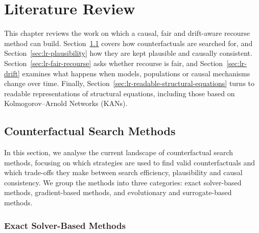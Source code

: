 \section{Literature Review}
\label{sec:literature-review}
This chapter reviews the work on which a causal, fair and drift-aware recourse method can build.
Section~\ref{sec:lr-cf-search} covers how counterfactuals are searched for, and
Section~\ref{sec:lr-plausibility} how they are kept plausible and causally consistent.
Section~\ref{sec:lr-fair-recourse} asks whether recourse is fair, and Section~\ref{sec:lr-drift}
examines what happens when models, populations or causal mechanisms change over time.
Finally, Section~\ref{sec:lr-readable-structural-equations} turns to readable representations of
structural equations, including those based on Kolmogorov--Arnold Networks (KANs).

\subsection{Counterfactual Search Methods}
\label{sec:lr-cf-search}
In this section, we analyse the current landscape of counterfactual search methods, focusing on
which strategies are used to find valid counterfactuals and which trade-offs they make between
search efficiency, plausibility and causal consistency. We group the methods into three categories:
exact solver-based methods, gradient-based methods, and evolutionary and surrogate-based methods.

\subsubsection{Exact Solver-Based Methods}
\label{subsec:lr-solver-search}


